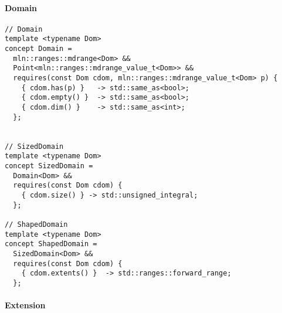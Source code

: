 \paragraph{Domain}

\begin{verbatim}
// Domain
template <typename Dom>
concept Domain =
  mln::ranges::mdrange<Dom> &&
  Point<mln::ranges::mdrange_value_t<Dom>> &&
  requires(const Dom cdom, mln::ranges::mdrange_value_t<Dom> p) {
    { cdom.has(p) }   -> std::same_as<bool>;
    { cdom.empty() }  -> std::same_as<bool>;
    { cdom.dim() }    -> std::same_as<int>;
  };


// SizedDomain
template <typename Dom>
concept SizedDomain =
  Domain<Dom> &&
  requires(const Dom cdom) {
    { cdom.size() } -> std::unsigned_integral;
  };

// ShapedDomain
template <typename Dom>
concept ShapedDomain =
  SizedDomain<Dom> &&
  requires(const Dom cdom) {
    { cdom.extents() }  -> std::ranges::forward_range;
  };
\end{verbatim}


\paragraph{Extension}

